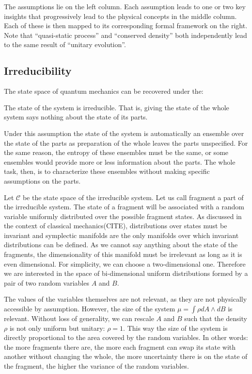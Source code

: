 \documentclass[11pt,letterpaper,fleqn]{memoir} %
\begin{document}
The assumptions lie on the left column. Each assumption leads to one or two key insights that progressively lead to the physical concepts in the middle column. Each of these is then mapped to its corresponding formal framework on the right. Note that ``quasi-static process'' and ``conserved density'' both independently lead to the same result of ``unitary evolution''.

\subsection{Irreducibility}

The state space of quantum mechanics can be recovered under the:

\begin{assump}[Irreducibility]
	The state of the system is irreducible. That is, giving the state of the whole system says nothing about the state of its parts.
\end{assump}

Under this assumption the state of the system is automatically an ensemble over the state of the parts as preparation of the whole leaves the parts unspecified. For the same reason, the entropy of these ensembles must be the same, or some ensembles would provide more or less information about the parts. The whole task, then, is to characterize these ensembles without making specific assumptions on the parts.

Let $\mathcal{C}$ be the state space of the irreducible system. Let us call fragment a part of the irreducible system. The state of a fragment will be associated with a random variable uniformly distributed over the possible fragment states. As discussed in the context of classical mechanics(CITE), distributions over states must be invariant and symplectic manifolds are the only manifolds over which invariant distributions can be defined. As we cannot say anything about the state of the fragments, the dimensionality of this manifold must be irrelevant as long as it is even dimensional. For simplicity, we can choose a two-dimensional one. Therefore we are interested in the space of bi-dimensional uniform distributions formed by a pair of two random variables $A$ and $B$.

The values of the variables themselves are not relevant, as they are not physically accessible by assumption. However, the size of the system $\mu = \int \rho dA \wedge dB$ is relevant. Without loss of generality, we can rescale $A$ and $B$ such that the density $\rho$ is not only uniform but unitary: $\rho = 1$. This way the size of the system is directly proportional to the area covered by the random variables. In other words: the more fragments there are, the more each fragment can swap its state with another without changing the whole, the more uncertainty there is on the state of the fragment, the higher the variance of the random variables.
\end{document}
